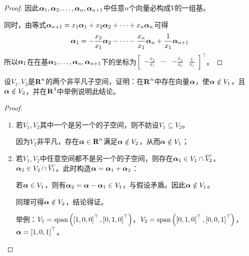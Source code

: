 \begin{proof}
    因此\({\boldsymbol{\alpha}}_1,{\boldsymbol{\alpha}}_2,\dots,{\boldsymbol{\alpha}}_{n},\boldsymbol{\alpha}_{n+1}\)中任意\(n\)个向量必构成\(V\)的一组基。

    同时，由等式\(\boldsymbol{\alpha}_{n+1}=x_1\boldsymbol{\alpha}_1+x_2\boldsymbol{\alpha}_2+\cdots+x_n\boldsymbol{\alpha}_n\)可得
    \begin{equation*}
        \boldsymbol{\alpha}_1=-\frac{x_2}{x_1}\boldsymbol{\alpha}_2-\cdots-\frac{x_n}{x_1}\boldsymbol{\alpha}_n+\frac{1}{x_1}\boldsymbol{\alpha}_{n+1}
    \end{equation*}
    所以\(\boldsymbol{\alpha}_1\)在在基\(\boldsymbol{\alpha}_2,\dots,\boldsymbol{\alpha}_n,\boldsymbol{\alpha}_{n+1}\)下的坐标为\(\begin{bmatrix}-\frac{x_2}{x_1}&\cdots&-\frac{x_n}{x_1}&\frac{1}{x_1}\end{bmatrix}^\top\)。
\end{proof}

\setcounter{problem}{11}
\begin{problem}
设\(V_1,V_2\)是\(\boldsymbol{\mathrm{R}}^n\)的两个非平凡子空间，证明：在\(\boldsymbol{\mathrm{R}}^n\)中存在向量\(\boldsymbol{\alpha}\)，使\(\boldsymbol{\alpha}\notin V_1\)，且\(\boldsymbol{\alpha}\notin V_2\)，并在\(\boldsymbol{\mathrm{R}}^3\)中举例说明此结论。
\end{problem}
\begin{proof}
    \begin{enumerate}
        \item {
              若\(V_1,V_2\)其中一个是另一个的子空间，则不妨设\(V_1\subseteq V_2\)。

              因为\(V_2\)非平凡，存在\(\boldsymbol{\alpha}\in\boldsymbol{\mathrm{R}}^n\)满足\(\boldsymbol{\alpha}\notin V_2\)，从而\(\boldsymbol{\alpha}\notin V_1\)；
              }
        \item {
              若\(V_1,V_2\)中任意空间都不是另一个的子空间，则存在\(\boldsymbol{\alpha}_1\in V_1\cap\overline{V_2}\)，\(\boldsymbol{\alpha}_2\in V_2\cap\overline{V_1}\)。此时构造\(\boldsymbol{\alpha}=\boldsymbol{\alpha}_1+\boldsymbol{\alpha}_2\)：

              若\(\boldsymbol{\alpha}\in V_1\)，则有\(\boldsymbol{\alpha}_2=\boldsymbol{\alpha}-\boldsymbol{\alpha}_1\in V_1\)，与假设矛盾。因此\(\boldsymbol{\alpha}\notin V_1\)。

              同理可得\(\boldsymbol{\alpha}\notin V_2\)，结论得证。

              举例：\(V_1=\mathrm{span}\left( \left[ 1,0,0 \right]^\top,\left[ 0,1,0 \right]^\top \right)\)，\(V_2=\mathrm{span}\left( \left[ 0,1,0 \right]^\top,\left[ 0,0,1 \right]^\top \right)\)，\(\boldsymbol{\alpha}=\left[ 1,0,1 \right]^\top\)。
              }
    \end{enumerate}
\end{proof}

